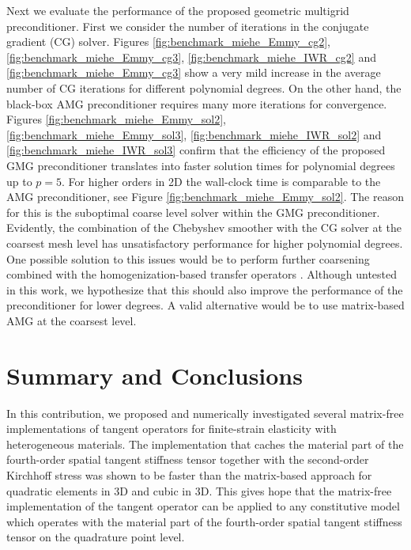 \documentclass[times,doublespace]{nmeauth}
\begin{document}
Next we evaluate the performance of the proposed geometric multigrid preconditioner.
First we consider the number of iterations in the conjugate gradient (CG) solver.
Figures \ref{fig:benchmark_miehe_Emmy_cg2}, \ref{fig:benchmark_miehe_Emmy_cg3}, \ref{fig:benchmark_miehe_IWR_cg2} and \ref{fig:benchmark_miehe_Emmy_cg3} show a very mild increase in the average number of CG iterations for different polynomial degrees.
On the other hand, the black-box AMG preconditioner requires many more iterations for convergence.
Figures \ref{fig:benchmark_miehe_Emmy_sol2}, \ref{fig:benchmark_miehe_Emmy_sol3}, \ref{fig:benchmark_miehe_IWR_sol2} and \ref{fig:benchmark_miehe_IWR_sol3} confirm that the efficiency of the proposed GMG preconditioner translates into faster solution times for polynomial degrees up to $p=5$.
For higher orders in 2D the wall-clock time is comparable to the AMG preconditioner, see Figure \ref{fig:benchmark_miehe_Emmy_sol2}.
The reason for this is the suboptimal coarse level solver within the GMG preconditioner.
Evidently, the combination of the Chebyshev smoother with the CG solver at the coarsest mesh level has unsatisfactory performance for higher polynomial degrees.
One possible solution to this issues would be to perform further coarsening combined with the homogenization-based transfer operators \cite{Miehe2007}.
Although untested in this work, we hypothesize that this should also improve the performance of the preconditioner for lower degrees.
A valid alternative would be to use matrix-based AMG at the coarsest level.

\section{Summary and Conclusions}
\label{sec:summary}

In this contribution, we proposed and numerically investigated several matrix-free implementations of tangent operators for finite-strain elasticity with heterogeneous materials.
The implementation that caches the {\color{red}material part of the fourth-order spatial tangent stiffness tensor} together with the second-order Kirchhoff stress was shown to be faster than the matrix-based approach for quadratic elements in 3D and cubic in 3D.
This gives hope that the matrix-free implementation of the tangent operator can be applied to any constitutive model which operates with the {\color{red}material part of the fourth-order spatial tangent stiffness tensor} on the quadrature point level.
\end{document}
